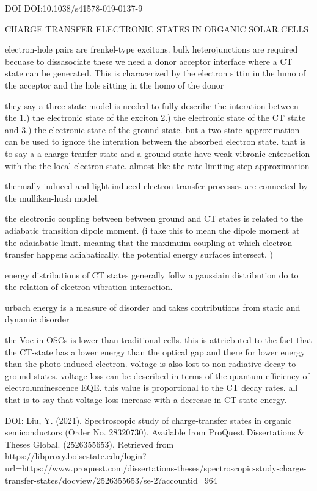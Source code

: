 DOI DOI:10.1038/s41578-019-0137-9

CHARGE TRANSFER ELECTRONIC STATES IN ORGANIC SOLAR CELLS

    electron-hole pairs are frenkel-type excitons. bulk heterojunctions are required becuase to dissasociate these we need a
    donor acceptor interface where a CT state can be generated. This is characerized by the electron sittin in the lumo of the 
    acceptor and the hole sitting in the homo of the donor

    they say a three state model is needed to fully describe the interation between the 1.) the electronic state of the exciton 
    2.) the electronic state of the CT state and 3.) the electronic state of the ground state. but a two state approximation can
    be used to ignore the interation between the absorbed electron state. that is to say a a charge tranfer state and a ground state 
    have weak vibronic enteraction with the the local electron state. almost like the rate limiting step approximation

    thermally induced and light induced electron transfer processes are connected by the mulliken-hush model.
    
    the electronic coupling between between ground and CT states is related to the adiabatic transition dipole moment. (i
    take this to mean the dipole moment at the adaiabatic limit. meaning that the maximuim coupling at which electron transfer 
    happens adiabatically. the potential energy surfaces intersect. )

    energy distributions of CT states generally follw a gaussiain distribution do to the relation of electron-vibration interaction. 

    urbach energy is a measure of disorder and takes contributions from static and dynamic disorder
    
    the Voc in OSCs is lower than traditional cells. this is attricbuted to the fact that the CT-state has a lower energy
    than the optical gap and there for lower energy than the photo induced electron. voltage is also lost to non-radiative
    decay to ground states. voltage loss can be described in terms of the quantum efficiency of electroluminescence EQE.  this
    value is proportional to the CT decay rates. all that is to say that voltage loss increase with a decrease in CT-state energy.



DOI: Liu, Y. (2021). Spectroscopic study of charge-transfer states in organic semiconductors (Order No. 28320730). Available from ProQuest Dissertations & Theses Global. (2526355653). Retrieved from https://libproxy.boisestate.edu/login?url=https://www.proquest.com/dissertations-theses/spectroscopic-study-charge-transfer-states/docview/2526355653/se-2?accountid=964

